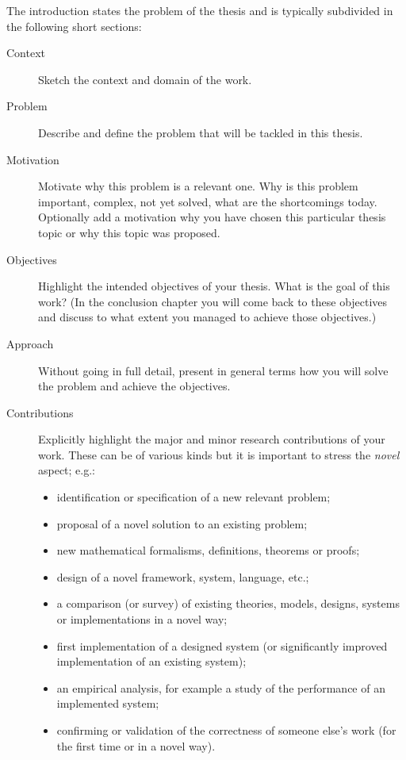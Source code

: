 \documentclass[twocolumn,british]{article}
\begin{document}
The introduction states the problem of the thesis and is typically subdivided in the following short sections:
\begin{description}

\item[Context] Sketch the context and domain of the work.

\item[Problem] Describe and define the problem that will be tackled in
  this thesis.

\item[Motivation] Motivate why this problem is a relevant one. Why is
  this problem important, complex, not yet solved, what are the
  shortcomings today. Optionally add a motivation why you have chosen
  this particular thesis topic or why this topic was proposed.

\item[Objectives] Highlight the intended objectives of your
  thesis. What is the goal of this work? (In the conclusion chapter
  you will come back to these objectives and discuss to what extent
  you managed to achieve those objectives.)

\item[Approach] Without going in full detail, present in general terms
  how you will solve the problem and achieve the objectives.

\item[Contributions] Explicitly highlight the major and minor research
  contributions of your work. These can be of various kinds but it is
  important to stress the \emph{novel} aspect; e.g.:
  \begin{itemize}
  \item identification or specification of a new relevant problem;
  \item proposal of a novel solution to an existing problem;
  \item new mathematical formalisms, definitions, theorems or proofs;
  \item design of a novel framework, system, language, etc.;
  \item a comparison (or survey) of existing theories, models,
    designs, systems or implementations in a novel way;
  \item first implementation of a designed system (or significantly
    improved implementation of an existing system);
  \item an empirical analysis, for example a study of the performance
    of an implemented system;
  \item confirming or validation of the correctness of someone else’s
    work (for the first time or in a novel way).
  \end{itemize}


\end{description}
\end{document}
